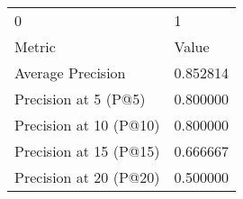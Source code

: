\begin{tabular}{ll}
0 & 1 \\
Metric & Value \\
Average Precision & 0.852814 \\
Precision at 5 (P@5) & 0.800000 \\
Precision at 10 (P@10) & 0.800000 \\
Precision at 15 (P@15) & 0.666667 \\
Precision at 20 (P@20) & 0.500000 \\
\end{tabular}
